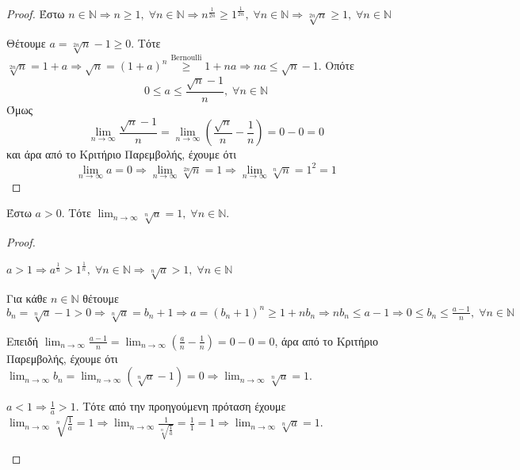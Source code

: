 \documentclass[a4paper,table]{report}
\begin{document}
\begin{proof}
  Έστω $ n \in \mathbb{N} \Rightarrow n \geq 1, \; \forall n \in 
  \mathbb{N} \Rightarrow n ^{\frac{1}{2n}} \geq 1^{\frac{1}{2n}}, \; 
  \forall n \in \mathbb{N} \Rightarrow \sqrt[2n]{n} \geq 1, \; \forall n 
  \in \mathbb{N} $

  Θέτουμε $ a = \sqrt[2n]{n} -1 \geq 0 $. Τότε $ \sqrt[2n]{n} = 1 + a 
  \Rightarrow \sqrt{n} = (1+a)^{n} \overset{\text{Bernoulli}}{\geq} 1 
  + na \Rightarrow na \leq \sqrt{n} - 1  $. Οπότε 
  \[ 
    0 \leq a \leq \frac{\sqrt{n} -1}{n}, \; \forall n \in \mathbb{N}
  \] 
  Όμως
  \[ 
    \lim_{n \to \infty} \frac{\sqrt{n} -1}{n} = \lim_{n \to \infty} 
    \left( \frac{\sqrt{n}}{n} - \frac{1}{n}\right) = 0 - 0 = 0 
  \] 
  και άρα από το Κριτήριο Παρεμβολής, έχουμε ότι 
  \[ 
    \lim_{n \to \infty} a = 0 
    \Rightarrow \lim_{n \to \infty} \sqrt[2n]{n} = 1 \Rightarrow \lim_{n \to
    \infty} \sqrt[n]{n} = 1^{2} = 1 
  \]
\end{proof}

\begin{mybox3}
  \begin{prop}
    Έστω $ a>0 $. Τότε $ \lim_{n \to \infty} \sqrt[n]{a}=1, \; \forall n \in
    \mathbb{N} $.
  \end{prop}
\end{mybox3}

\begin{proof}
\item {}
  \begin{myitemize}[labelindent=1em]
    \item $ a>1 \Rightarrow a^{\frac{1}{n}} > 1^{\frac{1}{n}}, \; 
      \forall n \in \mathbb{N} \Rightarrow \sqrt[n]{a} >1, \; 
      \forall n \in \mathbb{N} $

      Για κάθε $ n \in \mathbb{N} $ θέτουμε $ b_{n} = \sqrt[n]{a} -1 
      > 0 \Rightarrow \sqrt[n]{a} = b_{n} + 1 \Rightarrow a = (
      b_{n}+1)^{n} \geq 1 + n b_{n} \Rightarrow n b_{n} \leq a-1
      \Rightarrow 0 \leq b_{n} \leq \frac{a-1}{n}, \; \forall n \in
      \mathbb{N} $

      Επειδή $ \lim_{n \to \infty} \frac{a-1}{n} = \lim_{n \to \infty}
      \left(\frac{a}{n} - \frac{1}{n}\right) = 0 - 0 = 0 $, άρα από το 
      Κριτήριο Παρεμβολής, έχουμε ότι $ \lim_{n \to \infty} b_{n} = 
      \lim_{n \to \infty} (\sqrt[n]{a}-1) = 0 \Rightarrow \lim_{n \to
      \infty} \sqrt[n]{a} =1 $.

    \item $ a< 1 \Rightarrow \frac{1}{a} > 1 $. Τότε από την 
      προηγούμενη πρόταση έχουμε 
      $ \lim_{n \to \infty} \sqrt[n]{\frac{1}{a} } = 1 \Rightarrow 
      \lim_{n \to \infty} \frac{1}{\sqrt[n]{\frac{1}{a}}} = 
      \frac{1}{1} = 1 \Rightarrow \lim_{n \to \infty} \sqrt[n]{a} 
      = 1$.
  \end{myitemize}
\end{proof}
\end{document}
